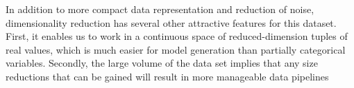 In addition to more compact data representation and reduction of noise, dimensionality reduction has several other attractive features for this dataset. First, it enables us to work in a continuous space of reduced-dimension tuples of real values, which is much easier for model generation than partially categorical variables. Secondly, the large volume of the data set implies that any size reductions that can be gained will result in more manageable data pipelines

